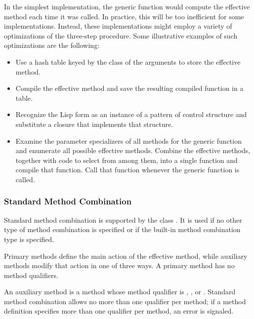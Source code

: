 \beforenoterule
\begin{implementation}
In the simplest implementation, the generic function would compute
the effective method each time it was called.  In practice, this will
be too inefficient for some implementations.  Instead, these
implementations might employ a variety of optimizations of the
three-step procedure. Some illustrative examples of such optimizations
are the following:

\begin{itemize}

\item  Use a hash table keyed by the class of the arguments to
store the effective method.

\item  Compile the effective method and save the resulting
compiled function in a table.

\item  Recognize the Lisp form as an instance of a pattern of
control structure and substitute a closure that implements
that structure.

\item  Examine the parameter specializers of all methods for the
generic function and enumerate all possible effective methods.
Combine the effective methods, together with code to select from
among them, into a single function and compile that function.  Call
that function whenever the generic function is called.
\end{itemize}
\end{implementation}
\afternoterule


\subsubsection{Standard Method Combination}
\label{Standard-Method-Combination-SECTION}

Standard method combination is supported by the class 
.
It is used if no other type of method
combination is specified or if the built-in method combination type
 is specified. 

{\bit Primary methods\/} define the main action of the effective method,  
while {\bit auxiliary methods\/} modify that action in one of three ways.
A primary method has no method qualifiers.

An auxiliary method is a method whose method qualifier is 
, , or .  Standard method combination
allows no more than one qualifier per method; if a method definition
specifies more than one qualifier per method, an error is signaled.

